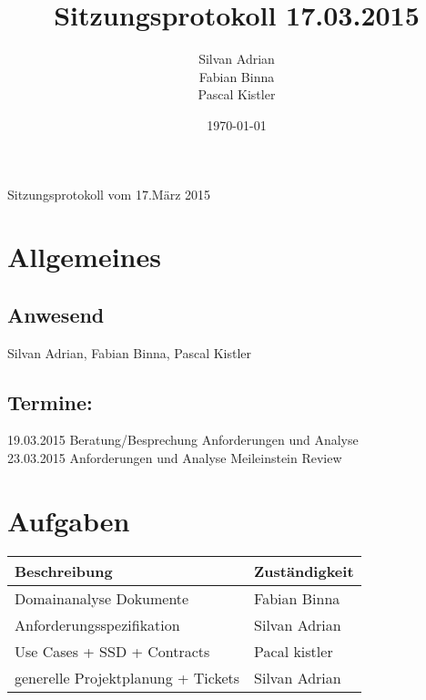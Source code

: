 \documentclass[11pt]{scrartcl}
\title{Sitzungsprotokoll 17.03.2015}
\author{Silvan Adrian \\ Fabian Binna \\ Pascal Kistler}
\date{\today{}}
\begin{document}
{\huge Sitzungsprotokoll vom 17.März 2015}

\section{Allgemeines}
\label{sec:Allgemein}

\subsection{Anwesend}
\label{sec:Anwesend}
Silvan Adrian, Fabian Binna, Pascal Kistler

\subsection{Termine:}
\label{sec:Termine}
19.03.2015 Beratung/Besprechung Anforderungen und Analyse \\
23.03.2015 Anforderungen und Analyse Meileinstein Review
\section{Aufgaben}
\label{sec:Aufgaben}
\begin{table}[h]
\begin{tabularx}{\textwidth}{X l }
\textbf{Beschreibung}  & \textbf{Zuständigkeit} \\
\hline
Domainanalyse Dokumente & Fabian Binna\\
\hline
Anforderungsspezifikation & Silvan Adrian \\
\hline
Use Cases + SSD + Contracts & Pacal kistler \\
\hline
generelle Projektplanung + Tickets & Silvan Adrian \\
\end{tabularx}
\end{table}
\end{document}
